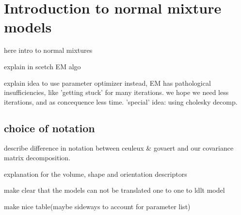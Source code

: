 \chapter{Introduction to normal mixture models}%

here intro to normal mixtures

explain in scetch EM algo

explain idea to use parameter optimizer instead,
EM has pathological insufficiencies, like 'getting stuck' for many iterations.
we hope we need less iterations, and as concequence less time.
'special' idea: using cholesky decomp.


\section{choice of notation}

describe difference in notation between ceuleux \& govaert and our covariance matrix decomposition.

explanation for the volume, shape and orientation descriptors

make clear that the models can not be translated one to one to ldlt model

make nice table(maybe sideways to account for parameter list)


